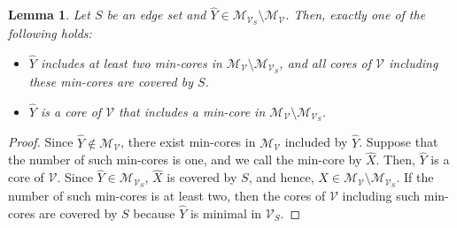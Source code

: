 \documentclass[11pt]{article}
\newtheorem{lemma}{Lemma}
\newcommand{\Mfam}{\mathcal{M}}
\newcommand{\Vfam}{\mathcal{V}}
\begin{document}
\begin{lemma}\label{lem.newcore}
 Let $S$ be an edge set and $\hat{Y} \in \Mfam_{\Vfam_S} \setminus \Mfam_{\Vfam}$.
 Then, exactly one of the following holds\/{\rm :}
\begin{itemize}
 \item $\hat{Y}$ includes at least two min-cores in $\Mfam_{\Vfam}
       \setminus \Mfam_{\Vfam_S}$,
       and all cores of $\Vfam$ including these min-cores are covered by
       $S$\/.
 \item $\hat{Y}$ is a core of $\Vfam$ that includes 
       a min-core in $\Mfam_{\Vfam} \setminus \Mfam_{\Vfam_S}$.
\end{itemize}
\end{lemma}
\begin{proof}
 Since $\hat{Y} \not\in \Mfam_{\Vfam}$, there exist min-cores in $\Mfam_{\Vfam}$
 included by $\hat{Y}$. Suppose that the number of such min-cores is
 one, and we call the min-core by $\hat{X}$. Then,
 $\hat{Y}$ is a core of $\Vfam$.
 Since $\hat{Y} \in \Mfam_{\Vfam_S}$, $\hat{X}$ is covered by $S$, and hence,
 $\hat{X} \in \Mfam_{\Vfam} \setminus \Mfam_{\Vfam_S}$.
 If the number of such min-cores is at least two, 
 then the cores of $\Vfam$ including such min-cores are covered by $S$
 because $\hat{Y}$ is minimal in $\Vfam_S$.
\end{proof}
\end{document}
